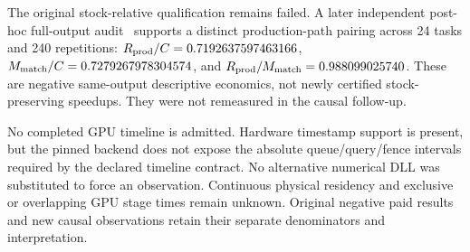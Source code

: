 The original stock-relative qualification remains failed. A later independent post-hoc full-output audit~\cite{bpostaudit} supports a distinct production-path pairing across 24 tasks and 240 repetitions: $R_{\rm prod}/C=0.7192637597463166$, $M_{\rm match}/C=0.7279267978304574$, and $R_{\rm prod}/M_{\rm match}=0.988099025740$. These are negative same-output descriptive economics, not newly certified stock-preserving speedups. They were not remeasured in the causal follow-up.

No completed GPU timeline is admitted. Hardware timestamp support is present, but the pinned backend does not expose the absolute queue/query/fence intervals required by the declared timeline contract. No alternative numerical DLL was substituted to force an observation. Continuous physical residency and exclusive or overlapping GPU stage times remain unknown. Original negative paid results and new causal observations retain their separate denominators and interpretation.
